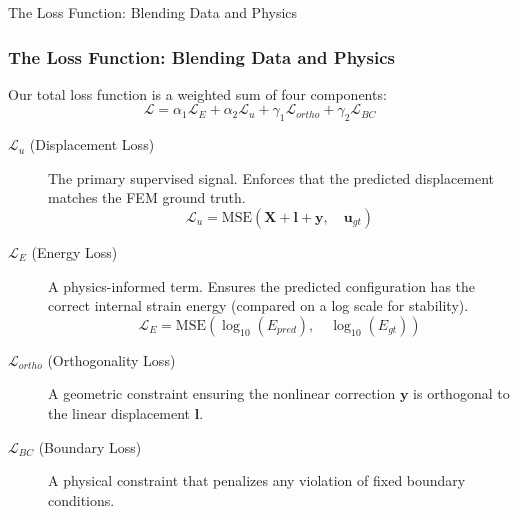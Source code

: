 \documentclass{beamer}
\begin{document}
\begin{frame}{The Loss Function: Blending Data and Physics}
    \frametitle{The Loss Function: Blending Data and Physics}
    
    Our total loss function is a weighted sum of four components:
    \begin{equation*}
        \mathcal{L} = \alpha_1 \mathcal{L}_E + \alpha_2 \mathcal{L}_u + \gamma_1 \mathcal{L}_{ortho} + \gamma_2 \mathcal{L}_{BC}
    \end{equation*}
    
    \begin{description}
        \item[\(\mathcal{L}_u\) (Displacement Loss)] The primary supervised signal. Enforces that the predicted displacement matches the FEM ground truth.
        \begin{equation*}
            \mathcal{L}_u = \text{MSE}(\bm{X} + \bm{l} + \bm{y}, \quad \bm{u}_{gt})
        \end{equation*}
        
        \item[\(\mathcal{L}_E\) (Energy Loss)] A physics-informed term. Ensures the predicted configuration has the correct internal strain energy (compared on a log scale for stability).
        \begin{equation*}
            \mathcal{L}_E = \text{MSE}(\log_{10}(E_{pred}), \quad \log_{10}(E_{gt}))
        \end{equation*}
        
        \item[\(\mathcal{L}_{ortho}\) (Orthogonality Loss)] A geometric constraint ensuring the nonlinear correction \(\bm{y}\) is orthogonal to the linear displacement \(\bm{l}\).
        
        \item[\(\mathcal{L}_{BC}\) (Boundary Loss)] A physical constraint that penalizes any violation of fixed boundary conditions.
    \end{description}
\end{frame}
\end{document}
